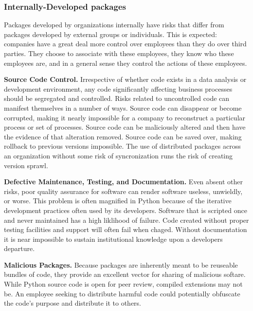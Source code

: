             \subsubsection{Internally-Developed packages}

                Packages developed by organizations internally have risks that differ from packages developed by external groups or individuals. This is expected: companies have a great deal more control over employees than they do over third parties. They choose to associate with these employees, they know who these employees are, and in a general sense they control the actions of these employees.

                \textbf{Source Code Control.}
                Irrespective of whether code exists in a data analysis or development environment, any code significantly affecting business processes should be segregated and controlled. Risks related to uncontrolled code can manifest themselves in a number of ways. Source code can disappear or become corrupted, making it nearly impossible for a company to reconstruct a particular process or set of processes. Source code can be maliciously altered and then have the evidence of that alteration removed. Source code can be saved over, making rollback to previous versions impossible. The use of distributed packages across an organization without some risk of syncronization runs the risk of creating version sprawl.

                \textbf{Defective Maintenance, Testing, and Documentation.}
                Even absent other risks, poor quality assurance for software can render software useless, unwieldly, or worse. This problem is often magnified in Python because of the iterative development practices often used by its developers. Software that is scripted once and never maintained has a high liklihood of failure. Code created without proper testing facilities and support will often fail when chaged. Without documentation it is near impossible to sustain institutional knowledge upon a developers departure.

                \textbf{Malicious Packages.}
                Because packages are inherently meant to be reuseable bundles of code, they provide an excellent vector for sharing of malicious softare. While Python source code is open for peer review, compiled extensions may not be. An employee seeking to distribute harmful code could potentially obfuscate the code's purpose and distribute it to others. 

